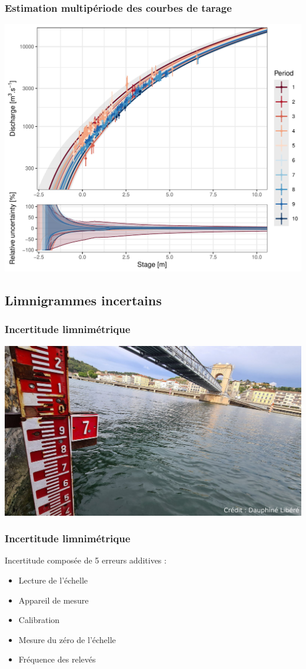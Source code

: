 \documentclass[compress,9pt]{beamer}
\begin{document}
	\begin{frame}
		\frametitle{Estimation multipériode des courbes de tarage}
		\centering
		\includegraphics[width = .7\textwidth]{./Figures/RClog_ICdownPt.pdf}  	
	\end{frame}
	
	\subsection{Limnigrammes incertains}
	\begin{frame}
		\frametitle{Incertitude limnimétrique}
		\centering
		\includegraphics[width = .6\textwidth]{./Figures/LimniVienne.png}  	
	\end{frame}		
	
	\begin{frame}
		\frametitle{Incertitude limnimétrique}
		Incertitude composée de 5 erreurs additives : 
		\vspace{15pt}
		\begin{itemize}
			\item<2->[$\vartriangleright$] Lecture de l'échelle
			\item<3->[$\vartriangleright$] Appareil de mesure
			\item<4->[$\vartriangleright$] Calibration
			\item<5->[$\vartriangleright$] Mesure du zéro de l'échelle
			\item<6> [$\vartriangleright$] Fréquence des relevés 
		\end{itemize}
	\end{frame}	
	
\end{document}
